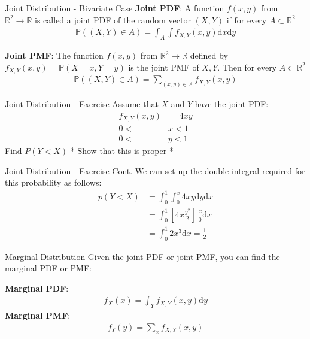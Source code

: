 \documentclass{beamer}
\begin{document}
\begin{frame}{Joint Distribution - Bivariate Case}
\textbf{Joint PDF}:
A function $f(x, y)$ from $\mathbb{R}^{2} \rightarrow \mathbb{R}$ is called a joint PDF of the random vector $(X, Y)$ if for every $A \subset \mathbb{R}^{2}$
\begin{align*}
\mathbb{P}((X, Y) \in A) = \int_{A}\int f_{X, Y}(x, y) \mathrm{d}x\mathrm{d}y
\end{align*} 

\textbf{Joint PMF}:
The function $f(x, y)$ from $\mathbb{R}^{2} \rightarrow \mathbb{R}$ defined by $f_{X, Y}(x, y) = \mathbb{P}(X = x, Y = y)$ is the joint PMF of $X, Y$. Then for every $A \subset \mathbb{R}^{2}$
\begin{align*}
\mathbb{P}((X, Y)\in A) = \sum_{(x, y)\in A}f_{X, Y}(x, y)
\end{align*}
\end{frame}

\begin{frame}{Joint Distribution - Exercise}
Assume that $X$ and $Y$ have the joint PDF:
\begin{align*}
    f_{X,Y}(x, y) &= 4xy \\
    0<&x<1\\
    0<&y<1
\end{align*}
Find $P(Y < X)$
* Show that this is proper *
\end{frame}
 
\begin{frame}{Joint Distribution - Exercise Cont.}
We can set up the double integral required for this probability as follows:
\begin{align*}
p(Y<X) &= \int_{0}^{1}\int_{0}^{x}4 xy \mathrm{d}y\mathrm{d}{x} \\
&= \int_{0}^{1}[4x \frac{y^{2}}{2}]\bigg|_{0}^{x}\mathrm{d}{x}\\
&= \int_{0}^{1}2x^{3}\mathrm{d}{x} = \frac{1}{2}
\end{align*}
\end{frame}
 

\begin{frame}{Marginal Distribution}
Given the joint PDF or joint PMF, you can find the marginal PDF or PMF:

\textbf{Marginal PDF}:
\begin{align*}
f_{X}(x) = \int_{Y} f_{X, Y}(x, y) \mathrm{d}y
\end{align*}
\textbf{Marginal PMF}:
\begin{align*}
f_{Y}(y) = \sum_{x} f_{X, Y}(x, y) 
\end{align*}
\end{frame}
\end{document}
